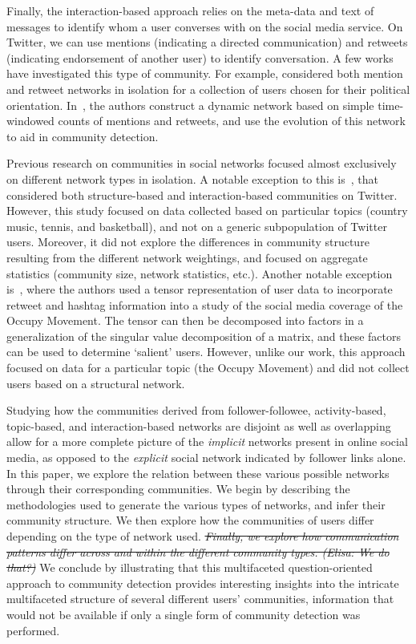 Finally, the interaction-based approach relies on the meta-data and text of messages to identify whom a user converses with on the social media service. On Twitter, we can use mentions (indicating a directed communication) and retweets (indicating endorsement of another user) to identify conversation. 
A few works have investigated this type of community. For example, \cite{conover2011political} considered both mention and retweet networks in isolation for a collection of users chosen for their political orientation. In~\cite{deitrick2013mutually}, the authors construct a dynamic network based on simple time-windowed counts of mentions and retweets, and use the evolution of this network to aid in community detection.

Previous research on communities in social networks focused almost exclusively on different network types in isolation.
A notable exception to this is~\cite{lim2012tweets}, that considered both structure-based and interaction-based communities on Twitter. However, this study focused on data collected based on particular topics (country music, tennis, and basketball), and not on a generic subpopulation of Twitter users. Moreover, it did not explore the differences in community structure resulting from the different network weightings, and focused on aggregate statistics (community size, network statistics, etc.). Another notable exception is~\cite{kao2013talison}, where the authors used a tensor representation of user data to incorporate retweet and hashtag information into a study of the social media coverage of the Occupy Movement. The tensor can then be decomposed into factors in a generalization of the singular value decomposition of a matrix, and these factors can be used to determine `salient' users. However, unlike our work, this approach focused on data for a particular topic (the Occupy Movement) and did not collect users based on a structural network.

Studying how the communities derived from follower-followee, activity-based, topic-based, and interaction-based networks are disjoint as well as overlapping allow for a more complete picture of the \emph{implicit} networks present in online social media, as opposed to the \emph{explicit} social network indicated by follower links alone. In this paper, we explore the relation between these various possible networks through their corresponding communities. We begin by describing the methodologies used to generate the various types of networks, and infer their community structure.  We then explore how the communities of users differ depending on the type of network used. \sout{\emph{Finally, we explore how communication patterns differ across and within the different community types. (Elisa: We do that?)}} We conclude by illustrating that this multifaceted question-oriented approach to community detection provides interesting insights into the intricate multifaceted structure of several different users' communities, information that would not be available if only a single form of community detection was performed. 

